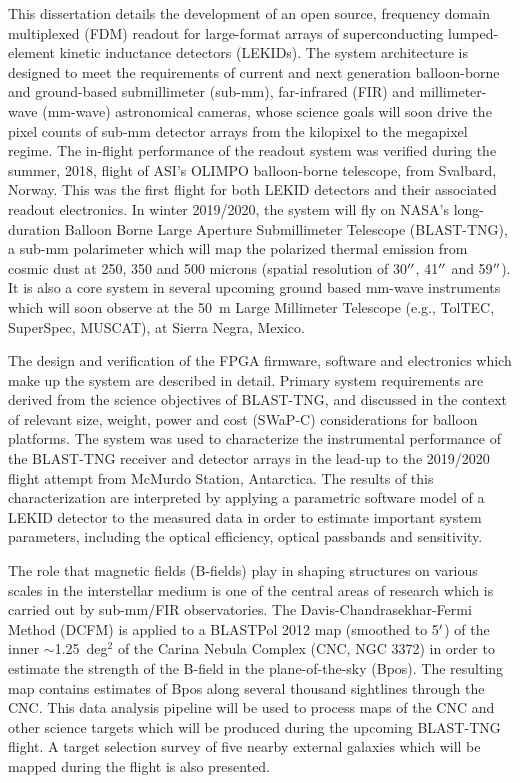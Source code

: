 This dissertation details the development of an open source, frequency domain multiplexed (FDM) readout for large-format arrays of superconducting lumped-element kinetic inductance detectors (LEKIDs). The system architecture is designed to meet the requirements of current and next generation balloon-borne and ground-based submillimeter (sub-mm), far-infrared (FIR) and millimeter-wave (mm-wave) astronomical cameras, whose science goals will soon drive the pixel counts of sub-mm detector arrays from the kilopixel to the megapixel regime. The in-flight performance of the readout system was verified during the summer, 2018, flight of ASI's OLIMPO balloon-borne telescope, from Svalbard, Norway. This was the first flight for both LEKID detectors and their associated readout electronics. In winter 2019/2020, the system will fly on NASA's long-duration Balloon Borne Large Aperture Submillimeter Telescope (BLAST-TNG), a sub-mm polarimeter which will map the polarized thermal emission from cosmic dust at 250, 350 and 500 microns (spatial resolution of 30$\operatorname{^{\prime\prime}}$, 41$\operatorname{^{\prime\prime}}$ and 59$\operatorname{^{\prime\prime}}$). It is also a core system in several upcoming ground based mm-wave instruments which will soon observe at the 50~m Large Millimeter Telescope (e.g., TolTEC, SuperSpec, MUSCAT), at Sierra Negra, Mexico.

The design and verification of the FPGA firmware, software and electronics which make up the system are described in detail. Primary system requirements are derived from the science objectives of BLAST-TNG, and discussed in the context of relevant size, weight, power and cost (SWaP-C) considerations for balloon platforms. The system was used to characterize the instrumental performance of the BLAST-TNG receiver and detector arrays in the lead-up to the 2019/2020 flight attempt from McMurdo Station, Antarctica. The results of this characterization are interpreted by applying a parametric software model of a LEKID detector to the measured data in order to estimate important system parameters, including the optical efficiency, optical passbands and sensitivity.

The role that magnetic fields (B-fields) play in shaping structures on various scales in the interstellar medium is one of the central areas of research which is carried out by sub-mm/FIR observatories. The Davis-Chandrasekhar-Fermi Method (DCFM) is applied to a BLASTPol 2012 map (smoothed to 5$\operatorname{^{\prime}}$) of the inner $\sim$1.25~deg$^{2}$ of the Carina Nebula Complex (CNC, NGC 3372) in order to estimate the strength of the B-field in the plane-of-the-sky (\gls{Bpos}). The resulting map contains estimates of \gls{Bpos} along several thousand sightlines through the CNC\@. This data analysis pipeline will be used to process maps of the CNC and other science targets which will be produced during the upcoming BLAST-TNG flight. A target selection survey of five nearby external galaxies which will be mapped during the flight is also presented.


